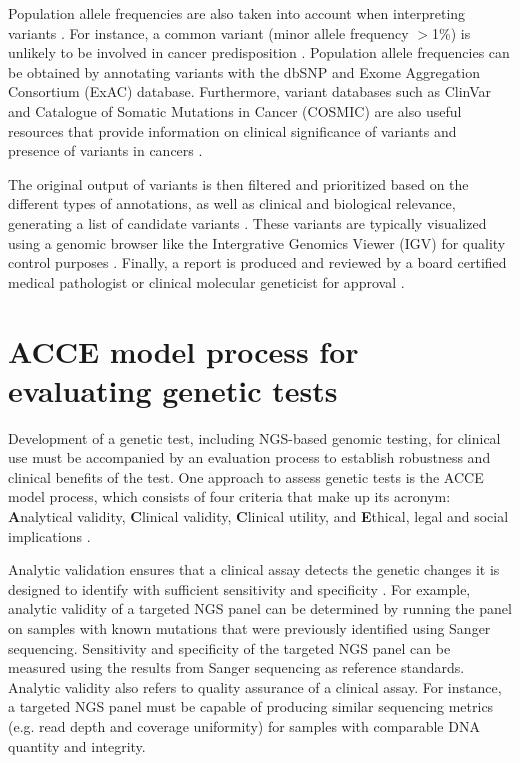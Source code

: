 Population allele frequencies are also taken into account when interpreting variants \cite{Oliver2015, Bao2014, Moorthie2013}. For instance, a common variant (minor allele frequency $>$1\%) is unlikely to be involved in cancer predisposition \cite{Baynes2007, Baker2006}. Population allele frequencies can be obtained by annotating variants with the dbSNP and Exome Aggregation Consortium (\acs{ExAC}) database. Furthermore, variant databases such as ClinVar and Catalogue of Somatic Mutations in Cancer (\acs{COSMIC}) are also useful resources that provide information on clinical significance of variants and presence of variants in cancers \cite{Oliver2015, Moorthie2013}.

The original output of variants is then filtered and prioritized based on the different types of annotations, as well as clinical and biological relevance, generating a list of candidate variants \cite{Moorthie2013, Oliver2015}. These variants are typically visualized using a genomic browser like the Intergrative Genomics Viewer (\acs{IGV}) for quality control purposes \cite{Oliver2015, Pabinger2014}. Finally, a report is produced and reviewed by a board certified medical pathologist or clinical molecular geneticist for approval \cite{Moorthie2013, Strom2016}.

\section{ACCE model process for evaluating genetic tests}
\label{sec:ACCEmodelprocessforevaluatinggenetictests}

Development of a genetic test, including NGS-based genomic testing, for clinical use must be accompanied by an evaluation process to establish robustness and clinical benefits of the test. One approach to assess genetic tests is the \acs{ACCE} model process, which consists of four criteria that make up its acronym: \textbf{A}nalytical validity, \textbf{C}linical validity, \textbf{C}linical utility, and \textbf{E}thical, legal and social implications \cite{Sanderson2005, Zimmern2007}.

Analytic validation ensures that a clinical assay detects the genetic changes it is designed to identify with sufficient sensitivity and specificity \cite{Sanderson2005, Zimmern2007}. For example, analytic validity of a targeted NGS panel can be determined by running the panel on samples with known mutations that were previously identified using Sanger sequencing. Sensitivity and specificity of the targeted NGS panel can be measured using the results from Sanger sequencing as reference standards. Analytic validity also refers to quality assurance of a clinical assay. For instance, a targeted NGS panel must be capable of producing similar sequencing metrics (e.g. read depth and coverage uniformity) for samples with comparable DNA quantity and integrity.

